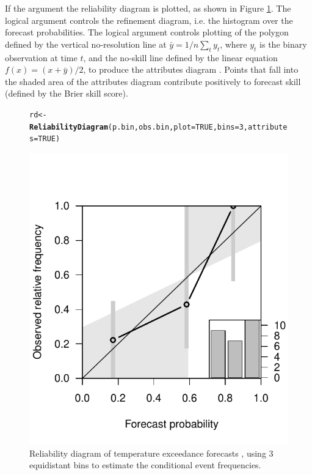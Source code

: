 \documentclass[article]{jss}\usepackage{graphicx, color}
\makeatletter
\def\maxwidth{ %
  \ifdim\Gin@nat@width>\linewidth
    \linewidth
  \else
    \Gin@nat@width
  \fi
}
\newcommand{\hlfunctioncall}[1]{\textcolor[rgb]{0,0.501960784313725,0.752941176470588}{\textbf{#1}}}%
\newenvironment{kframe}{%
 \def\at@end@of@kframe{}%
 \ifinner\ifhmode%
  \def\at@end@of@kframe{\end{minipage}}%
  \begin{minipage}{\columnwidth}%
 \fi\fi%
 \def\FrameCommand##1{\hskip\@totalleftmargin \hskip-\fboxsep
 \colorbox{shadecolor}{##1}\hskip-\fboxsep
     \hskip-\linewidth \hskip-\@totalleftmargin \hskip\columnwidth}%
 \MakeFramed {\advance\hsize-\width
   \@totalleftmargin\z@ \linewidth\hsize
   \@setminipage}}%
 {\par\unskip\endMakeFramed%
 \at@end@of@kframe}
\newenvironment{knitrout}{}{} %
\makeatother
\begin{document}
%
If the argument  the reliability diagram is plotted, as shown in Figure \ref{reldiag-plot}. 
The logical argument  controls the refinement diagram, i.e. the histogram over the forecast probabilities.
The logical argument  controls plotting of the polygon defined by the vertical no-resolution line at $\bar{y} = 1/n \sum_t y_t$, where $y_t$ is the binary observation at time $t$, and the no-skill line defined by the linear equation $f(x)=(x+\bar{y})/2$, to produce the attributes diagram \citep{hsu1986attributes}.
Points that fall into the shaded area of the attributes diagram contribute positively to forecast skill (defined by the Brier skill score).

\begin{figure}
\begin{center}
%
\begin{knitrout}
\color{fgcolor}\begin{kframe}
\begin{alltt}
rd <- \hlfunctioncall{ReliabilityDiagram}(p.bin, obs.bin, plot=TRUE, bins=3, attributes=TRUE)
\end{alltt}
\end{kframe}
\includegraphics[width=\maxwidth]{figure/reldiag} 

\end{knitrout}

%
\end{center}
\caption{Reliability diagram of temperature exceedance forecasts , using 3 equidistant bins to estimate the conditional event frequencies.} 
\label{reldiag-plot}
\end{figure}
\end{document}

